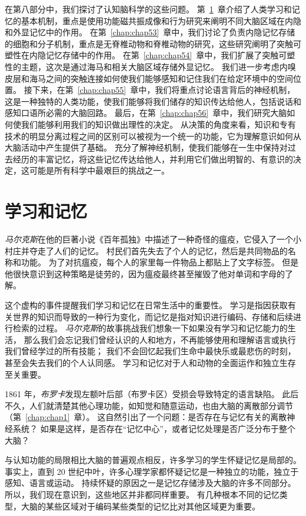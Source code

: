 在第八部分中，我们探讨了认知脑科学的这些问题。
第~\ref{chap:chap52}~章介绍了人类学习和记忆的基本机制，重点是使用功能磁共振成像和行为研究来阐明不同大脑区域在内隐和外显记忆中的作用。
在第~\ref{chap:chap53}~章中，我们讨论了负责内隐记忆存储的细胞和分子机制，重点是无脊椎动物和脊椎动物的研究，这些研究阐明了突触可塑性在内隐记忆存储中的作用。
在第~\ref{chap:chap54}~章中，我们扩展了突触可塑性的主题，这次是通过海马和相关大脑区域存储外显记忆。
我们进一步考虑内嗅皮层和海马之间的突触连接如何使我们能够感知和记住我们在给定环境中的空间位置。
接下来，在第~\ref{chap:chap55}~章中，我们将重点讨论语言背后的神经机制，这是一种独特的人类功能，使我们能够将我们储存的知识传达给他人，包括说话和感知口语所必需的大脑回路。
最后，在第~\ref{chap:chap56}~章中，我们研究大脑如何使我们能够利用我们的知识做出理性的决定。
从决策的角度来看，知识和专有技术的明显分离过程之间的区别可以被视为一个统一的功能，它为理解意识如何从大脑活动中产生提供了基础。
充分了解神经机制，使我们能够在一生中保持对过去经历的丰富记忆，将这些记忆传达给他人，并利用它们做出明智的、有意识的决定，这可能是所有科学中最艰巨的挑战之一。



\chapter{学习和记忆} \label{chap:chap52}

\textit{马尔克斯}在他的巨著小说《百年孤独》中描述了一种奇怪的瘟疫，它侵入了一个小村庄并夺走了人们的记忆。
村民们首先失去了个人的记忆，然后是共同物品的名称和功能。
为了对抗瘟疫，每个人的家里每一件物品上都贴上了文字标签。
但是他很快意识到这种策略是徒劳的，因为瘟疫最终甚至摧毁了他对单词和字母的了解。


这个虚构的事件提醒我们学习和记忆在日常生活中的重要性。
学习是指因获取有关世界的知识而导致的一种行为变化，而记忆是指对知识进行编码、存储和后续进行检索的过程。
\textit{马尔克斯}的故事挑战我们想象一下如果没有学习和记忆能力的生活，
那么我们会忘记我们曾经认识的人和地方，不再能够使用和理解语言或执行我们曾经学过的所有技能；
我们不会回忆起我们生命中最快乐或最悲伤的时刻，甚至会失去我们的个人认同感。
学习和记忆对于人和动物的全面运作和独立生存至关重要。


1861 年，\textit{布罗卡}发现左额叶后部（布罗卡区）受损会导致特定的语言缺陷。
此后不久，人们就清楚其他心理功能，如知觉和随意运动，也由大脑的离散部分调节（第~\ref{chap:chap1}~章）。
这自然引出了一个问题：是否存在与记忆有关的离散神经系统？
如果是这样，是否存在“记忆中心”，或者记忆处理是否广泛分布于整个大脑？


与认知功能的局限相比大脑的普遍观点相反，许多学习的学生怀疑记忆是局部的。
事实上，直到 20 世纪中叶，许多心理学家都怀疑记忆是一种独立的功能，独立于感知、语言或运动。
持续怀疑的原因之一是记忆存储涉及大脑的许多不同部分。
所以，我们现在意识到，这些地区并非都同样重要。
有几种根本不同的记忆类型，大脑的某些区域对于编码某些类型的记忆比对其他区域更为重要。


